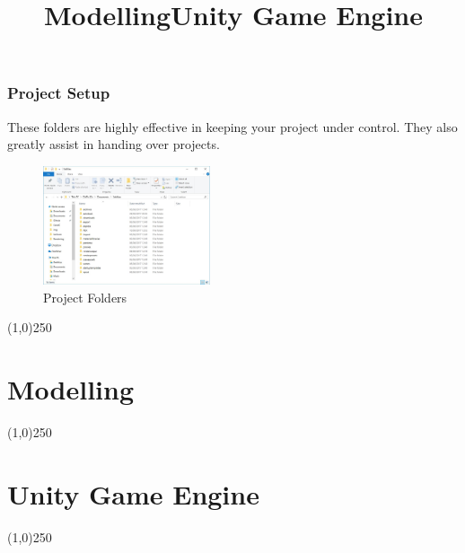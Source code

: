 \begin{frame}
\frametitle{Project Setup}
These folders are highly effective in keeping your project under control.  They also greatly assist in handing over projects.
\begin{figure}
	\centering
	\includegraphics[height=3.5cm]{img/ProjectFolders}
	\caption[Project Folders]{Project Folders}
	\label{fig:projectFolders}
\end{figure}
\end{frame}
\begin{center}\line(1,0){250}\end{center}








\section{Modelling}
\begin{frame}
	\title[Modelling]{Modelling}
	\titlepage
\end{frame}\begin{center}\line(1,0){250}\end{center}







\section{Unity Game Engine}
\begin{frame}
\title[Modelling]{Unity Game Engine}
\titlepage
\end{frame}\begin{center}\line(1,0){250}\end{center}



















